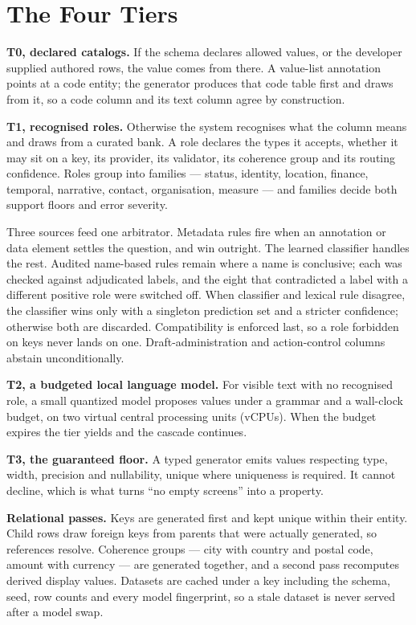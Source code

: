 \documentclass[conference]{IEEEtran}
\begin{document}
\section{The Four Tiers}
\label{sec:tiers}

\textbf{T0, declared catalogs.} If the schema declares allowed values,
or the developer supplied authored rows, the value comes from there. A
value-list annotation points at a code entity; the generator produces
that code table first and draws from it, so a code column and its text
column agree by construction.

\textbf{T1, recognised roles.} Otherwise the system recognises what the
column means and draws from a curated bank. A role declares the types it
accepts, whether it may sit on a key, its provider, its validator, its
coherence group and its routing confidence. Roles group into families
--- status, identity, location, finance, temporal, narrative, contact,
organisation, measure --- and families decide both support floors and
error severity.

Three sources feed one arbitrator. Metadata rules fire when an
annotation or data element settles the question, and win outright. The
learned classifier handles the rest. Audited name-based rules remain
where a name is conclusive; each was checked against adjudicated labels,
and the eight that contradicted a label with a different positive role
were switched off. When classifier and lexical rule disagree, the
classifier wins only with a singleton prediction set and a stricter
confidence; otherwise both are discarded. Compatibility is enforced
last, so a role forbidden on keys never lands on one. Draft-administration
and action-control columns abstain unconditionally.

\textbf{T2, a budgeted local language model.} For visible text with no
recognised role, a small quantized model proposes values under a grammar
and a wall-clock budget, on two virtual central processing units
(vCPUs). When the budget expires the tier yields and the cascade
continues.

\textbf{T3, the guaranteed floor.} A typed generator emits values
respecting type, width, precision and nullability, unique where
uniqueness is required. It cannot decline, which is what turns ``no
empty screens'' into a property.

\textbf{Relational passes.} Keys are generated first and kept unique
within their entity. Child rows draw foreign keys from parents that were
actually generated, so references resolve. Coherence groups --- city
with country and postal code, amount with currency --- are generated
together, and a second pass recomputes derived display values. Datasets
are cached under a key including the schema, seed, row counts and every
model fingerprint, so a stale dataset is never served after a model
swap.
\end{document}
